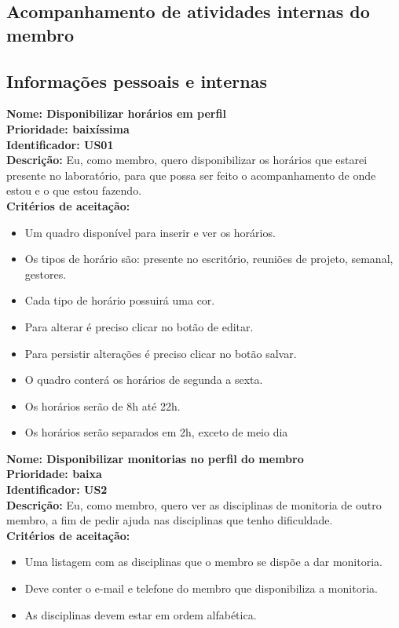 \begin{anexosenv}
\section{Acompanhamento de atividades internas do membro}

\subsection{Informações pessoais e internas}

\textbf{Nome: Disponibilizar horários em perfil\\
Prioridade: baixíssima\\
Identificador: US01\\
Descrição: }Eu, como membro, quero disponibilizar os horários que estarei presente no laboratório, para que possa ser feito o acompanhamento de onde estou e o que estou fazendo.\\
\textbf{Critérios de aceitação:}
\begin{itemize}
    \item Um quadro disponível para inserir e ver os horários.
    \item Os tipos de horário são: presente no escritório, reuniões de projeto, semanal, gestores.
    \item Cada tipo de horário possuirá uma cor.
    \item Para alterar é preciso clicar no botão de editar.
    \item Para persistir alterações é preciso clicar no botão salvar.
    \item O quadro conterá os horários de segunda a sexta.
    \item Os horários serão de 8h até 22h.
    \item Os horários serão separados em 2h, exceto de meio dia
\end{itemize}

\textbf{Nome: Disponibilizar monitorias no perfil do membro\\
Prioridade: baixa\\
Identificador: US2\\
Descrição:} Eu, como membro, quero ver as disciplinas de monitoria de outro membro, a fim de pedir ajuda nas disciplinas que tenho dificuldade.\\
\textbf{Critérios de aceitação:}
\begin{itemize}
    \item Uma listagem com as disciplinas que o membro se dispõe a dar monitoria.
    \item Deve conter o e-mail e telefone do membro que disponibiliza a monitoria.
    \item As disciplinas devem estar em ordem alfabética.
\end{itemize}


\end{anexosenv}
